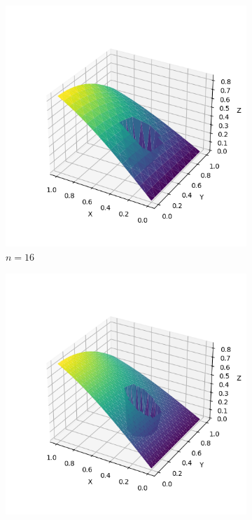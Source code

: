 \documentclass[lang=cn,a4paper,newtx,bibend=bibtex]{elegantpaper}
\begin{document}
\begin{figure}[H]
\begin{subfigure}[b]{0.18\textwidth}
      \includegraphics[width=\textwidth]{../../res_bac/res-[data|2-Dirichlet-irregular-b16].png}
      \caption{$n= 16$}
  \end{subfigure}
  \hfill
  \begin{subfigure}[b]{0.18\textwidth}
      \includegraphics[width=\textwidth]{../../res_bac/res-[data|2-Dirichlet-irregular-c32].png}

\end{subfigure}
\end{figure}
\end{document}
